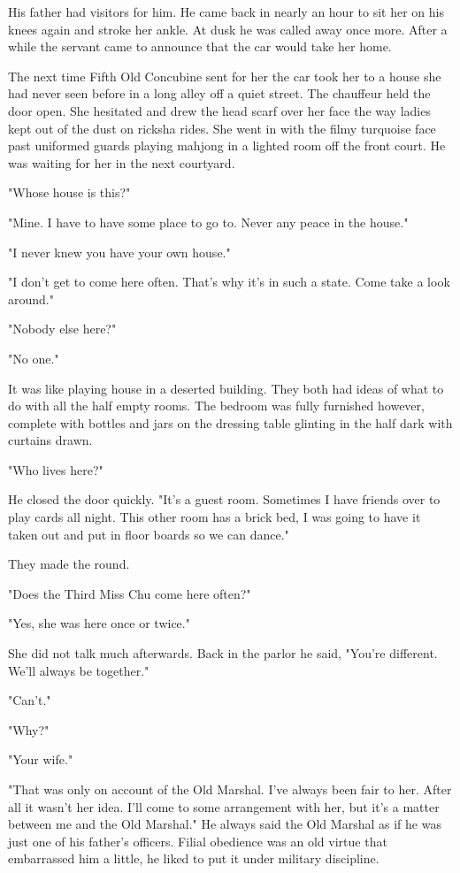 \par His father had visitors for him. He came back in nearly an hour to sit her on his knees again and stroke her ankle. At dusk he was called away once more. After a while the servant came to announce that the car would take her home.
\par The next time Fifth Old Concubine sent for her the car took her to a house she had never seen before in a long alley off a quiet street. The chauffeur held the door open. She hesitated and drew the head scarf over her face the way ladies kept out of the dust on ricksha rides. She went in with the filmy turquoise face past uniformed guards playing mahjong in a lighted room off the front court. He was waiting for her in the next courtyard.
\par "Whose house is this?"
\par "Mine. I have to have some place to go to. Never any peace in the house."
\par "I never knew you have your own house."
\par "I don't get to come here often. That's why it's in such a state. Come take a look around."
\par "Nobody else here?"
\par "No one."
\par It was like playing house in a deserted building. They both had ideas of what to do with all the half empty rooms. The bedroom was fully furnished however, complete with bottles and jars on the dressing table glinting in the half dark with curtains drawn.
\par "Who lives here?"
\par He closed the door quickly. "It's a guest room. Sometimes I have friends over to play cards all night. This other room has a brick bed, I was going to have it taken out and put in floor boards so we can dance."
\par They made the round.
\par "Does the Third Miss Chu come here often?"
\par "Yes, she was here once or twice."
\par She did not talk much afterwards. Back in the parlor he said, "You're different. We'll always be together."
\par "Can't."
\par "Why?"
\par "Your wife."
\par "That was only on account of the Old Marshal. I've always been fair to her. After all it wasn't her idea. I'll come to some arrangement with her, but it's a matter between me and the Old Marshal." He always said the Old Marshal as if he was just one of his father's officers. Filial obedience was an old virtue that embarrassed him a little, he liked to put it under military discipline.

